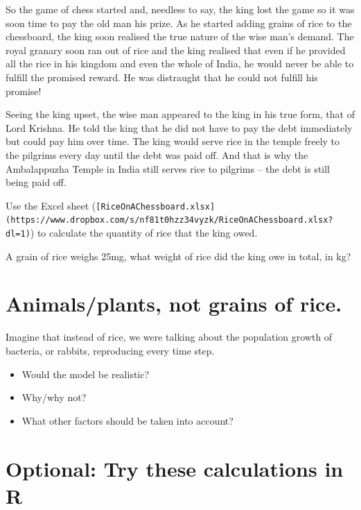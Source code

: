 \documentclass[
  a4paper]{book}
\providecommand{\tightlist}{%
  \setlength{\itemsep}{0pt}\setlength{\parskip}{0pt}}
\begin{document}
So the game of chess started and, needless to say, the king lost the
game so it was soon time to pay the old man his prize. As he started
adding grains of rice to the chessboard, the king soon realised the true
nature of the wise man's demand. The royal granary soon ran out of rice
and the king realised that even if he provided all the rice in his
kingdom and even the whole of India, he would never be able to fulfill
the promised reward. He was distraught that he could not fulfill his
promise!

Seeing the king upset, the wise man appeared to the king in his true
form, that of Lord Krishna. He told the king that he did not have to pay
the debt immediately but could pay him over time. The king would serve
rice in the temple freely to the pilgrims every day until the debt was
paid off. And that is why the Ambalappuzha Temple in India still serves
rice to pilgrims -- the debt is still being paid off.

\begin{do-something}
Use the Excel sheet
(\texttt{{[}RiceOnAChessboard.xlsx{]}(https://www.dropbox.com/s/nf81t0hzz34vyzk/RiceOnAChessboard.xlsx?dl=1)})
to calculate the quantity of rice that the king owed.

A grain of rice weighs 25mg, what weight of rice did the king owe in
total, in kg?
\end{do-something}

\hypertarget{animalsplants-not-grains-of-rice.}{%
\section{Animals/plants, not grains of
rice.}\label{animalsplants-not-grains-of-rice.}}

Imagine that instead of rice, we were talking about the population
growth of bacteria, or rabbits, reproducing every time step.

\begin{itemize}
\tightlist
\item
  Would the model be realistic?
\item
  Why/why not?
\item
  What other factors should be taken into account?
\end{itemize}

\hypertarget{optional-try-these-calculations-in-r}{%
\section{Optional: Try these calculations in
R}\label{optional-try-these-calculations-in-r}}
\end{document}
